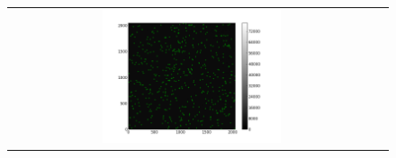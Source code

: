 \documentclass[letterpaper,12pt]{article}
\begin{document}
\begin{figure}
\begin{tabular}{cc}
                                                                                                                                                                                                                                                                                                                                                                                                                                                                                                                                                                                                                                                                                                                                                                                                                               \includegraphics[width=0.5\textwidth]{maximas_20.png} 

\end{tabular}
\end{figure}
\end{document}
